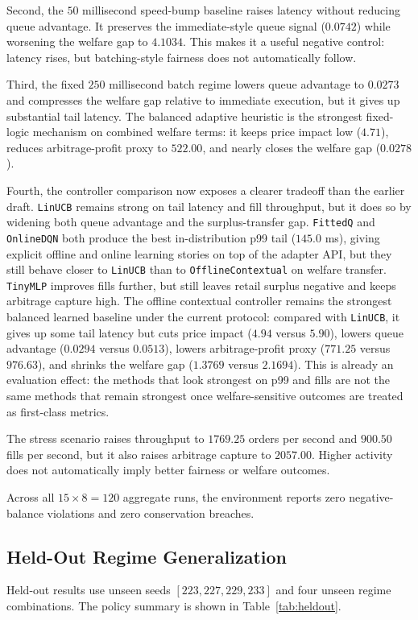 \documentclass[11pt]{article}
\begin{document}
Second, the $50$ millisecond speed-bump baseline raises latency without reducing queue advantage. It preserves the immediate-style queue signal ($0.0742$) while worsening the welfare gap to $4.1034$. This makes it a useful negative control: latency rises, but batching-style fairness does not automatically follow.

Third, the fixed $250$ millisecond batch regime lowers queue advantage to $0.0273$ and compresses the welfare gap relative to immediate execution, but it gives up substantial tail latency. The balanced adaptive heuristic is the strongest fixed-logic mechanism on combined welfare terms: it keeps price impact low ($4.71$), reduces arbitrage-profit proxy to $522.00$, and nearly closes the welfare gap ($0.0278$).

Fourth, the controller comparison now exposes a clearer tradeoff than the earlier draft. \texttt{LinUCB} remains strong on tail latency and fill throughput, but it does so by widening both queue advantage and the surplus-transfer gap. \texttt{FittedQ} and \texttt{OnlineDQN} both produce the best in-distribution p99 tail ($145.0$ ms), giving explicit offline and online learning stories on top of the adapter API, but they still behave closer to \texttt{LinUCB} than to \texttt{OfflineContextual} on welfare transfer. \texttt{TinyMLP} improves fills further, but still leaves retail surplus negative and keeps arbitrage capture high. The offline contextual controller remains the strongest balanced learned baseline under the current protocol: compared with \texttt{LinUCB}, it gives up some tail latency but cuts price impact ($4.94$ versus $5.90$), lowers queue advantage ($0.0294$ versus $0.0513$), lowers arbitrage-profit proxy ($771.25$ versus $976.63$), and shrinks the welfare gap ($1.3769$ versus $2.1694$). This is already an evaluation effect: the methods that look strongest on p99 and fills are not the same methods that remain strongest once welfare-sensitive outcomes are treated as first-class metrics.

The stress scenario raises throughput to $1769.25$ orders per second and $900.50$ fills per second, but it also raises arbitrage capture to $2057.00$. Higher activity does not automatically imply better fairness or welfare outcomes.

Across all $15 \times 8 = 120$ aggregate runs, the environment reports zero negative-balance violations and zero conservation breaches.

\subsection{Held-Out Regime Generalization}
Held-out results use unseen seeds $[223,227,229,233]$ and four unseen regime combinations. The policy summary is shown in Table~\ref{tab:heldout}.
\end{document}
